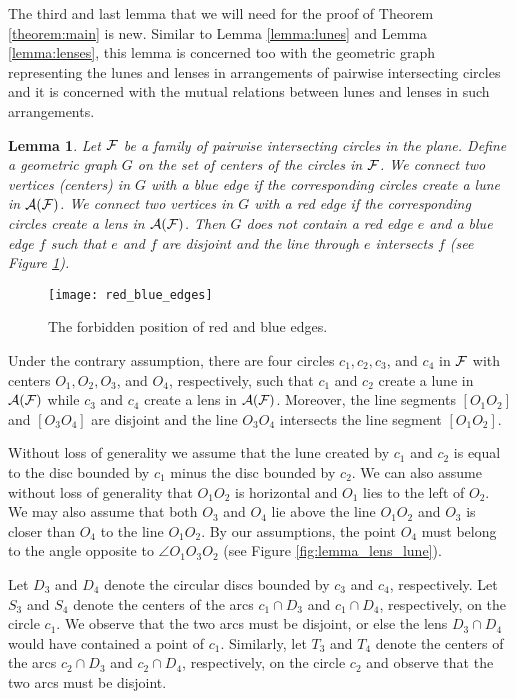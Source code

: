 \documentclass[11pt,a4paper]{article}
\newcommand{\F}{{\cal{F}}}
\newcommand{\A}{{\cal{A}}}
\newtheorem{lemma}{Lemma}
\begin{document}
\bigskip

The third and last lemma that we will need for the proof of Theorem \ref{theorem:main}
is new. Similar to 
Lemma \ref{lemma:lunes} and Lemma \ref{lemma:lenses}, this lemma is concerned too with the geometric graph representing the lunes and lenses in arrangements of pairwise intersecting circles and it is concerned with the mutual relations between lunes and lenses in such arrangements. 

\begin{lemma}\label{lemma:lunes_lenses}
Let $\F$ be a family of pairwise intersecting circles in the plane. Define
a geometric graph $G$ on the set of centers
of the circles in $\F$. We connect two vertices (centers) in $G$ with a blue edge
if the corresponding circles create a lune in $\A(\F)$. We connect two vertices in $G$ with a red edge if the corresponding circles create a lens in $\A(\F)$.
Then $G$ does not contain a red edge $e$ and a blue edge $f$ such that $e$ and $f$ are disjoint and the line through $e$ intersects $f$ (see Figure \ref{fig:red_blue_edges}).
\end{lemma}

\begin{figure}[ht]
	\centering
	\texttt{[image: red\_blue\_edges]}
	\caption{The forbidden position of red and blue edges.}
	\label{fig:red_blue_edges}
\end{figure}

Under the contrary assumption, there are four circles $c_{1}, c_{2}, c_{3}$, and $c_{4}$ in $\F$ 
with centers $O_{1}, O_{2}, O_{3}$, and $O_{4}$, respectively,
such that $c_{1}$ and $c_{2}$ create a lune in $\A(\F)$ while $c_{3}$ and $c_{4}$ create a lens in $\A(\F)$. Moreover, the line segments 
$[O_{1}O_{2}]$ and $[O_{3}O_{4}]$ are disjoint and the line $O_{3}O_{4}$ intersects 
the line segment $[O_{1}O_{2}]$.

Without loss of generality we assume that 
the lune created by $c_{1}$ and $c_{2}$ is equal to the disc bounded by $c_{1}$ minus the disc bounded by $c_{2}$. We can also assume without loss of generality that $O_{1}O_{2}$ is horizontal and
$O_{1}$ lies to the left of $O_{2}$. We may also assume that both $O_{3}$ and $O_{4}$ lie 
above the line $O_{1}O_{2}$ and $O_{3}$ is closer than $O_{4}$ to the line $O_{1}O_{2}$. By our assumptions, the point $O_{4}$ must belong to the angle opposite to $\angle O_{1}O_{3}O_{2}$ (see Figure \ref{fig:lemma_lens_lune}).

Let $D_{3}$ and $D_{4}$ denote the circular discs bounded by $c_{3}$ and $c_{4}$, respectively.
Let $S_{3}$ and $S_{4}$ denote the centers
of the arcs $c_{1} \cap D_{3}$ and $c_{1} \cap D_{4}$, respectively, on the circle $c_{1}$. We observe that the two arcs 
must be disjoint, or else the lens $D_{3} \cap D_{4}$ would have contained a point of $c_{1}$.
Similarly, let $T_{3}$ and $T_{4}$
denote the centers of the arcs $c_{2} \cap D_{3}$ and $c_{2} \cap D_{4}$, respectively, on the circle $c_{2}$
and observe that the two arcs must be disjoint.
\end{document}
